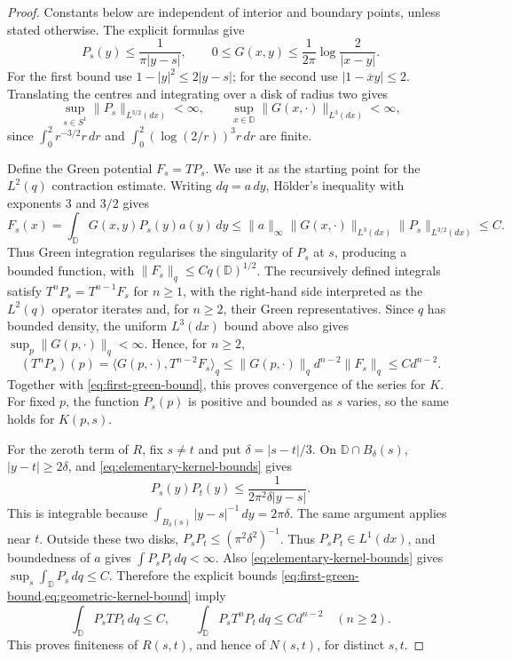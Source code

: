 \begin{proof}
Constants below are independent of interior and boundary points,
unless stated otherwise. The explicit formulas give
\begin{equation}\label{eq:elementary-kernel-bounds}
 P_s(y)\le\frac1{\pi|y-s|},
 \qquad 0\le G(x,y)\le\frac1{2\pi}\log\frac2{|x-y|}.
\end{equation}
For the first bound use $1-|y|^2\le2|y-s|$; for the second use
$|1-\overline{x}y|\le2$. Translating the centres and integrating
over a disk of radius two gives
\[
 \sup_{s\in S^1}\|P_s\|_{L^{3/2}(dx)}<\infty,
 \qquad
 \sup_{x\in\mathbb D}\|G(x,\cdot)\|_{L^3(dx)}<\infty,
\]
since $\int_0^2 r^{-3/2}r\,dr$ and
$\int_0^2(\log(2/r))^3r\,dr$ are finite.

Define the Green potential $F_s=TP_s$. We use it as the starting
point for the $L^2(q)$ contraction estimate. Writing $dq=a\,dy$,
H\"older's inequality with exponents $3$ and $3/2$ gives
\begin{equation}\label{eq:first-green-bound}
 F_s(x)=\int_{\mathbb D}G(x,y)P_s(y)a(y)\,dy
 \le\|a\|_\infty\|G(x,\cdot)\|_{L^3(dx)}
                   \|P_s\|_{L^{3/2}(dx)}\le C.
\end{equation}
Thus Green integration regularises the singularity of $P_s$ at
$s$, producing a bounded function, with
$\|F_s\|_q\le Cq(\mathbb D)^{1/2}$. The recursively defined
integrals satisfy $T^nP_s=T^{n-1}F_s$ for $n\ge1$, with the
right-hand side interpreted as the $L^2(q)$ operator iterates and,
for $n\ge2$, their Green representatives.
Since $q$ has bounded density, the uniform $L^3(dx)$ bound above
also gives $\sup_p\|G(p,\cdot)\|_q<\infty$. Hence, for $n\ge2$,
\begin{equation}\label{eq:geometric-kernel-bound}
 (T^nP_s)(p)
 =\langle G(p,\cdot),T^{n-2}F_s\rangle_q
 \le\|G(p,\cdot)\|_q d^{n-2}\|F_s\|_q
 \le C d^{n-2}.
\end{equation}
Together with \cref{eq:first-green-bound}, this proves convergence
of the series for $K$. For fixed $p$, the function $P_s(p)$ is
positive and bounded as $s$ varies, so the same holds for $K(p,s)$.

For the zeroth term of $R$, fix $s\ne t$ and put
$\delta=|s-t|/3$. On $\mathbb D\cap B_\delta(s)$,
$|y-t|\ge2\delta$, and \cref{eq:elementary-kernel-bounds} gives
\[
 P_s(y)P_t(y)\le\frac1{2\pi^2\delta|y-s|}.
\]
This is integrable because
$\int_{B_\delta(s)}|y-s|^{-1}\,dy=2\pi\delta$.
The same argument applies near $t$. Outside these two disks,
$P_sP_t\le(\pi^2\delta^2)^{-1}$. Thus $P_sP_t\in L^1(dx)$,
and boundedness of $a$ gives $\int P_sP_t\,dq<\infty$.
Also \cref{eq:elementary-kernel-bounds} gives
$\sup_s\int_{\mathbb D}P_s\,dq\le C$. Therefore the explicit
bounds \cref{eq:first-green-bound,eq:geometric-kernel-bound} imply
\[
 \int_{\mathbb D}P_sTP_t\,dq\le C,
 \qquad
 \int_{\mathbb D}P_sT^nP_t\,dq\le C d^{n-2}\quad(n\ge2).
\]
This proves finiteness of $R(s,t)$, and hence of $N(s,t)$, for
distinct $s,t$.


\end{proof}
